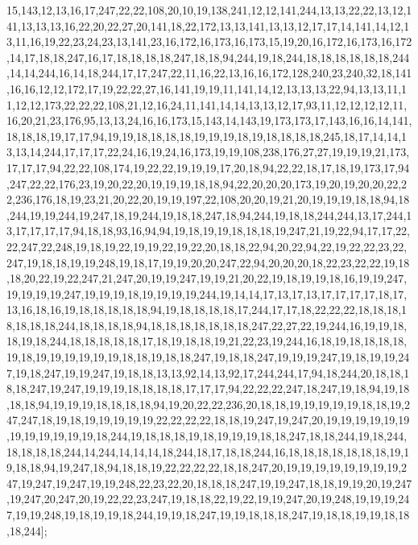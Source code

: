 15,143,12,13,16,17,247,22,22,108,20,10,19,138,241,12,12,141,244,13,13,22,22,13,12,141,13,13,13,16,22,20,22,27,20,141,18,22,172,13,13,141,13,13,12,17,17,14,141,14,12,13,11,16,19,22,23,24,23,13,141,23,16,172,16,173,16,173,15,19,20,16,172,16,173,16,172,14,17,18,18,247,16,17,18,18,18,18,247,18,18,94,244,19,18,244,18,18,18,18,18,18,244,14,14,244,16,14,18,244,17,17,247,22,11,16,22,13,16,16,172,128,240,23,240,32,18,141,16,16,12,12,172,17,19,22,22,27,16,141,19,19,11,141,14,12,13,13,13,22,94,13,13,11,11,12,12,173,22,22,22,108,21,12,16,24,11,141,14,14,13,13,12,17,93,11,12,12,12,12,11,16,20,21,23,176,95,13,13,24,16,16,173,15,143,14,143,19,173,173,17,143,16,16,14,141,18,18,18,19,17,17,94,19,19,18,18,18,18,19,19,19,18,19,18,18,18,18,245,18,17,14,14,13,13,14,244,17,17,17,22,24,16,19,24,16,173,19,19,108,238,176,27,27,19,19,19,21,173,17,17,17,94,22,22,108,174,19,22,22,19,19,19,17,20,18,94,22,22,18,17,18,19,173,17,94,247,22,22,176,23,19,20,22,20,19,19,19,18,18,94,22,20,20,20,173,19,20,19,20,20,22,22,236,176,18,19,23,21,20,22,20,19,19,197,22,108,20,20,19,21,20,19,19,19,18,18,94,18,244,19,19,244,19,247,18,19,244,19,18,18,247,18,94,244,19,18,18,244,244,13,17,244,13,17,17,17,17,94,18,18,93,16,94,94,19,18,19,19,18,18,18,19,247,21,19,22,94,17,17,22,22,247,22,248,19,18,19,22,19,19,22,19,22,20,18,18,22,94,20,22,94,22,19,22,22,23,22,247,19,18,18,19,19,248,19,18,17,19,19,20,20,247,22,94,20,20,20,18,22,23,22,22,19,18,18,20,22,19,22,247,21,247,20,19,19,247,19,19,21,20,22,19,18,19,19,18,16,19,19,247,19,19,19,19,247,19,19,19,18,19,19,19,19,244,19,14,14,17,13,17,13,17,17,17,17,18,17,13,16,18,16,19,18,18,18,18,18,94,19,18,18,18,18,17,244,17,17,18,22,22,22,18,18,18,18,18,18,18,244,18,18,18,18,94,18,18,18,18,18,18,18,247,22,27,22,19,244,16,19,19,18,18,19,18,244,18,18,18,18,18,17,18,19,18,18,19,21,22,23,19,244,16,18,19,18,18,18,18,19,18,19,19,19,19,19,19,18,18,19,18,18,247,19,18,18,247,19,19,19,247,19,18,19,19,247,19,18,247,19,19,247,19,18,18,13,13,92,14,13,92,17,244,244,17,94,18,244,20,18,18,18,18,247,19,247,19,19,19,18,18,18,18,17,17,17,94,22,22,22,247,18,247,19,18,94,19,18,18,18,94,19,19,19,18,18,18,18,94,19,20,22,22,236,20,18,18,19,19,19,19,19,18,18,19,247,247,18,19,18,19,19,19,19,19,22,22,22,22,18,18,19,247,19,247,20,19,19,19,19,19,19,19,19,19,19,19,19,18,244,19,18,18,18,19,18,19,19,19,18,18,247,18,18,244,19,18,244,18,18,18,18,244,14,244,14,14,14,18,244,18,17,18,18,244,16,18,18,18,18,18,18,18,19,19,18,18,94,19,247,18,94,18,18,19,22,22,22,22,18,18,247,20,19,19,19,19,19,19,19,19,247,19,247,19,247,19,19,248,22,23,22,20,18,18,18,247,19,19,247,18,18,19,19,20,19,247,19,247,20,247,20,19,22,22,23,247,19,18,18,22,19,22,19,19,247,20,19,248,19,19,19,247,19,19,248,19,18,19,19,18,244,19,19,18,247,19,19,18,18,18,247,19,18,18,19,19,18,18,18,244];


